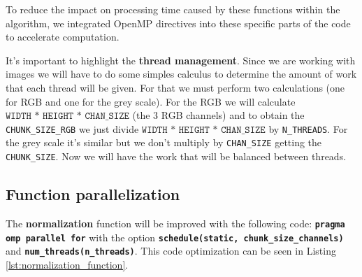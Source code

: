 \documentclass[sigconf]{acmart}
\begin{document}
 To reduce the impact on processing time caused by these functions within the algorithm, we integrated OpenMP directives into these specific parts of the code to accelerate computation.
 
 It's important to highlight the \textbf{thread management}. Since we are working with images we will have to do some simples calculus to determine the amount of work that
 each thread will be given. For that we must perform two calculations (one for RGB and one for the grey scale). For the RGB  we will calculate $\texttt{WIDTH * HEIGHT * CHAN\_SIZE}$  (the 3 RGB channels) and to obtain the \texttt{CHUNK\_SIZE\_RGB} we just divide $\texttt{WIDTH * HEIGHT * CHAN\_SIZE}$  by \texttt{N\_THREADS}. For the grey scale it's similar but we don't multiply by \texttt{CHAN\_SIZE} getting the \texttt{CHUNK\_SIZE}. Now we will have the work that will be balanced between threads.
 
\subsection{\textbf{Function parallelization}}

The \textbf{normalization} function will be improved with the following code: \texttt{\textbf{pragma omp parallel for}} with the option \texttt{\textbf{schedule(static, chunk\_size\_channels)}} and \texttt{\textbf{num\_threads(n\_threads)}}. This code optimization can be seen in Listing \ref{lst:normalization_function}.
\end{document}
